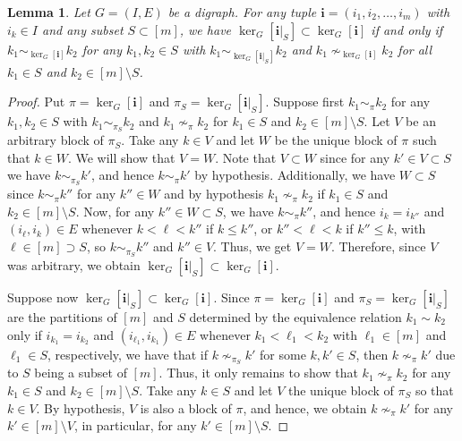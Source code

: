 \documentclass[a4paper,12pt]{extarticle}
\newtheorem{lem}[thm]{Lemma}
\theoremstyle{definition}
\theoremstyle{remark}
\begin{document}
\begin{lem}\label{lem_weak_bm_ver_kernel}
	Let $G = (I,E)$ be a digraph. For any tuple $\bm{i} = (i_1,i_2,\ldots,i_m)$ with $i_k \in I$ and any subset $S \subset [m]$, we have 
	$\ker_{G}[\bm{i}|_S] \subset \ker_G[\bm{i}]$ if and only if $k_1 \sim_{ \ker_G[\bm{i}]} k_2$ for any $k_1,k_2 \in S$ with $k_1 \sim_{ \ker_G[\bm{i}|_S]} k_2$ and $k_1 \nsim_{ \ker_G[\bm{i}]} k_2$ for all $k_1 \in S$ and $k_2 \in [m]\setminus S$. 
\end{lem}
\begin{proof}
	Put $\pi = \ker_G[\bm{i}]$ and $\pi_S = \ker_G[\bm{i}|_S]$. 
	Suppose first $k_1 \sim_{\pi} k_2$ for any $k_1,k_2 \in S$ with  $k_1 \sim_{\pi_S} k_2$ and $k_1 \nsim_{\pi} k_2$ for $k_1 \in S$ and $k_2 \in [m]\setminus S$. 
	Let $V$ be an arbitrary block of $\pi_S$.
	Take any $k \in V$ and let $W$ be the unique block of $\pi$ such that $k \in W$. 
	We will show that $V = W$. 
	Note that $V \subset W$ since for any $k' \in V \subset S$ we have $k \sim_{\pi_S} k'$, and hence $k \sim_{\pi} k'$ by hypothesis.   
	Additionally, we have $W \subset S$ since $k \sim_\pi k''$ for any $k'' \in W$ and by hypothesis $k_1 \nsim_{\pi} k_2$ if $k_1 \in S$ and $k_2 \in [m]\setminus S$. 
	Now, for any $k'' \in W \subset S$, we have $k \sim_\pi k''$, and hence $i_{k} = i_{k''} $ and $(i_{\ell},i_{k}) \in E$ whenever $k < \ell < k''$ if $k \leq k''$, or $k'' < \ell < k$ if $k'' \leq k$, with $\ell  \in [m] \supset S$, so $k \sim_{\pi_S} k''$ and $k'' \in V$.  
	Thus, we get $V = W$. Therefore, since $V$ was arbitrary, we obtain $\ker_{G}[\bm{i}|_S] \subset \ker_G[\bm{i}]$. 
	
	
	Suppose now $\ker_{G}[\bm{i}|_S] \subset \ker_G[\bm{i}]$. 
	Since  $\pi = \ker_G[\bm{i}]$ and $\pi_S = \ker_G[\bm{i}|_S]$ are the partitions of $[m]$ and $S$ determined by the equivalence relation $k_1 \sim k_2$ only if $i_{k_1} = i_{k_2} $ and $(i_{\ell_1},i_{k_1}) \in E$ whenever $k_1 < \ell_1 < k_2$ with $\ell_1 \in [m]$ and $\ell_1 \in S$, respectively, we have that if $k \nsim_{\pi_S} k'$ for some $k,k' \in S$, then $k \nsim_{\pi} k'$ due to $S$ being a subset of $[m]$.  
	Thus, it only remains to show that $k_1 \nsim_{\pi} k_2$ for any $k_1 \in S$ and $k_2 \in [m]\setminus S$. 
	Take any $k \in S$ and let $V$ the unique block of $\pi_S$  so that $k \in V$.
	By hypothesis, $V$ is also a block of $\pi$, and hence, we obtain $k \nsim_\pi k'$ for any $k' \in [m]\setminus V$, in particular, for any $k' \in [m]\setminus S$. 
\end{proof}
\end{document}
